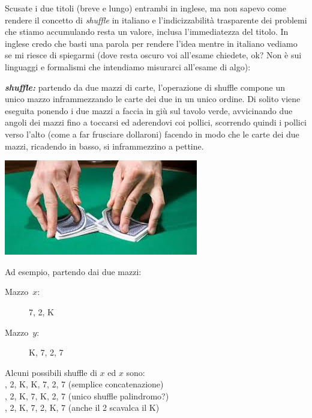 \renewcommand{\nomebreve}{is\_shuffle\_of}
\renewcommand{\titolo}{Can a deck of cards be obtained as the shuffle of two?}

\introduzione{}

Scusate i due titoli (breve e lungo)
entrambi in inglese, ma non sapevo come rendere il concetto di \emph{shuffle} in italiano e l'indicizzabilità trasparente dei problemi che stiamo accumulando resta un valore, inclusa l'immediatezza del titolo.
In inglese credo che basti una parola per rendere l'idea mentre in italiano vediamo se mi riesce di spiegarmi (dove resta oscuro voi all'esame chiedete, ok? Non è sui linguaggi e formalismi che intendiamo misurarci all'esame di algo):\\

\noindent
  \begin{minipage}[c]{.48\textwidth}
     \emph{\bf shuffle:}\/ partendo da due mazzi di carte, l'operazione di shuffle compone un unico mazzo inframmezzando le carte dei due in un unico ordine. Di solito viene eseguita ponendo i due mazzi a faccia in giù sul tavolo verde, avvicinando due angoli dei mazzi fino a toccarsi ed aderendovi coi pollici, scorrendo quindi i pollici verso l'alto (come a far frusciare dollaroni) facendo in modo che le carte dei due mazzi, ricadendo in basso, si inframmezzino a pettine.
   \end{minipage}%
\hspace{8.0mm}%
\begin{minipage}[c]{.50\textwidth}
   \includegraphics[scale=0.7]{figs/card_shuffle.jpeg}
\end{minipage}

\medskip

  \begin{minipage}[c]{.40\textwidth}
    Ad esempio, partendo dai due mazzi:
    \begin{description}
      \item[{\sc Mazzo~$x$:}] 7, 2, K
      \vspace{-2mm}
      \item[{\sc Mazzo~$y$:}] K, 7, 2, 7
    \end{description}
  \end{minipage}%
\hspace{8.0mm}%
  \begin{minipage}[c]{.50\textwidth} 
    Alcuni possibili shuffle di $x$ ed $x$ sono:\\
    , 2, K, K, 7, 2, 7 (semplice concatenazione)\\
    , 2, K, 7, K, 2, 7 (unico shuffle palindromo?)\\
    , 2, K, 7, 2, K, 7 (anche il 2 scavalca il K)\\
  \end{minipage}

